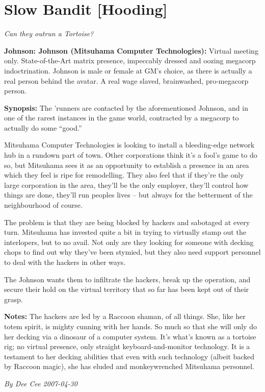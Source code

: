 \documentclass[letterpaper,twocolumn,10.5pt]{article}
\newenvironment{scenario}[6]
	{
		\section{#1 {\small[#2]}}
		\textit{#3}
		\def\TMPSCENARIO{#4 #5}
	}
	{\small\textit{By \TMPSCENARIO}}
\newcommand{\johnson}[2]{\textbf{Johnson: #1 (#2):}}
\newcommand{\synopsis}{\textbf{Synopsis: }}
\newcommand{\notes}{\textbf{Notes: }}
\begin{document}
\begin{scenario}{Slow Bandit}
	{Hooding}
	{ Can they outrun a Tortoise?}
	{Dee Cee}
	{2007-04-30}
	{https://forum.rpg.net/showthread.php?321504-Shadowrun-4th-101-Instant-Scenarios\&p=7237758#post7237758}

\johnson{Johnson}{Mitsuhama Computer Technologies}  Virtual meeting only. State-of-the-Art matrix presence, impeccably dressed and oozing megacorp indoctrination. Johnson is male or female at GM's choice, as there is actually a real person behind the avatar. A real wage slaved, brainwashed, pro-megacorp person.

\synopsis  The 'runners are contacted by the aforementioned Johnson, and in one of the rarest instances in the game world, contracted by a megacorp to actually do some ``good.''

Mitsuhama Computer Technologies is looking to install a bleeding-edge network hub in a rundown part of town. Other corporations think it's a fool's game to do so, but Mitsuhama sees it as an opportunity to establish a presence in an area which they feel is ripe for remodelling. They also feel that if they're the only large corporation in the area, they'll be the only employer, they'll control how things are done, they'll run peoples lives – but always for the betterment of the neighbourhood of course.

The problem is that they are being blocked by hackers and sabotaged at every turn. Mitsuhama has invested quite a bit in trying to virtually stamp out the interlopers, but to no avail. Not only are they looking for someone with decking chops to find out why they've been stymied, but they also need support personnel to deal with the hackers in other ways.

The Johnson wants them to infiltrate the hackers, break up the operation, and secure their hold on the virtual territory that so far has been kept out of their grasp.

\notes  The hackers are led by a Raccoon shaman, of all things. She, like her totem spirit, is mighty cunning with her hands. So much so that she will only do her decking via a dinosaur of a computer system. It's what's known as a tortoise rig; no virtual presence, only straight keyboard-and-monitor technology. It is a testament to her decking abilities that even with such technology (albeit backed by Raccoon magic), she has eluded and monkeywrenched Mitsuhama personnel.


\end{scenario}
\end{document}
